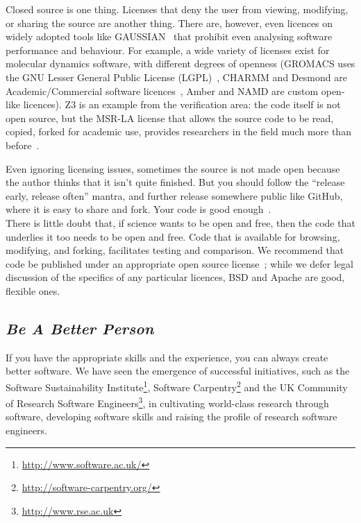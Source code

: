 \documentclass[a4paper,11pt]{article}
\begin{document}
Closed source is one thing. Licenses that deny the user from viewing,
modifying, or sharing the source are another thing. There are,
however, even licences on widely adopted tools like
GAUSSIAN~\cite{Giles2004} that prohibit even analysing software
performance and behaviour. For example, a wide variety of licenses
exist for molecular dynamics software, with different degrees of
openness (GROMACS uses the GNU Lesser General Public License
(LGPL)~\cite{Hess2008}, CHARMM and Desmond are Academic/Commercial
software licences~\cite{Brooks2009,Bowers2006}, Amber and NAMD are
custom open-like licences). Z3 is an example from the verification
area: the code itself is not open source, but the MSR-LA license that
allows the source code to be read, copied, forked for academic use,
provides researchers in the field much more than
before~\cite{deMoura2012Z3open}.

Even ignoring licensing issues, sometimes the source is not made open
because the author thinks that it isn't quite finished. 
But you should follow the ``release early, release often'' mantra, and
further release somewhere public like GitHub, where it is easy to
share and fork. Your code is good enough~\cite{barnes:2010}.
\\
 
 There is little
doubt that, if science wants to be open and free, then the code that
underlies it too needs to be open and free. Code that is available for
browsing, modifying, and forking, facilitates testing and comparison.
We recommend that code be published under an appropriate open source
license~\cite{osl}; while we defer legal discussion of the specifics
of any particular licences, BSD and Apache are good,
flexible ones.\\



\subsection{{\emph{Be A Better Person}}}

If you have the appropriate skills and the experience, you can always
create better software. We have seen the emergence of successful
initiatives, such as the Software Sustainability
Institute\footnote{\url{http://www.software.ac.uk/}}, Software
Carpentry\footnote{\url{http://software-carpentry.org/}} and the UK
Community of Research Software
Engineers\footnote{\url{http://www.rse.ac.uk}}, in cultivating
world-class research through software, developing software skills and
raising the profile of research software engineers.
\end{document}
